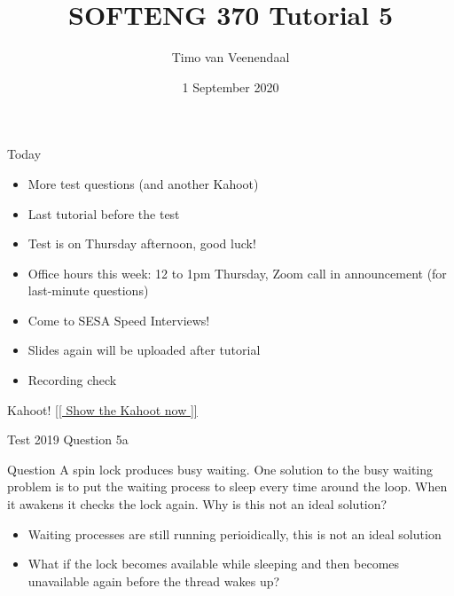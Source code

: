 \documentclass[notes]{beamer}
\title{SOFTENG 370 Tutorial 5}
\author{Timo van Veenendaal}
\date{1 September 2020}
\begin{document}
\maketitle

\begin{frame}{Today}
    \begin{itemize}
        \item More test questions (and another Kahoot)
        \item Last tutorial before the test
        \item Test is on Thursday afternoon, good luck!
        \item Office hours this week: 12 to 1pm Thursday, Zoom call in announcement (for last-minute questions)
        \item Come to SESA Speed Interviews!
        \item Slides again will be uploaded after tutorial
        \item Recording check
    \end{itemize}
\end{frame}
\begin{frame}{Kahoot!}
    \href{https://play.kahoot.it/v2/?quizId=a560fc0b-16cc-4157-b2ee-17d910e96774}{[[ Show the Kahoot now ]]}
\end{frame}
\begin{frame}{Test 2019 Question 5a}
    \begin{alertblock}{Question}
        A spin lock produces busy waiting. One solution to the busy waiting problem is to put the waiting process to sleep every time around the loop. When it awakens it checks the lock again. Why is this not an ideal solution?
    \end{alertblock}
    \pause
    \begin{itemize}
        \item Waiting processes are still running perioidically, this is not an ideal solution
        \item What if the lock becomes available while sleeping and then becomes unavailable again before the thread wakes up?
    \end{itemize}
\end{frame}
\end{document}
